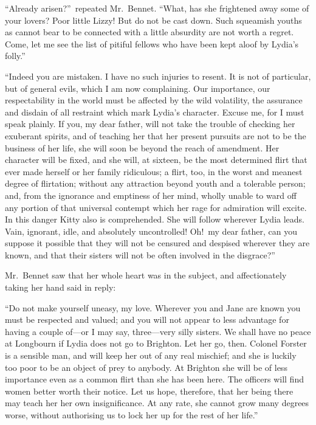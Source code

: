 \documentclass[12pt,english,oneside]{book}
\begin{document}
{}``Already arisen?''\ repeated Mr.\ Bennet. {}``What, has she
frightened away some of your lovers? Poor little Lizzy! But do not
be cast down. Such squeamish youths as cannot bear to be connected
with a little absurdity are not worth a regret. Come, let me see the
list of pitiful fellows who have been kept aloof by Lydia's folly.''

{}``Indeed you are mistaken. I have no such injuries to resent. It
is not of particular, but of general evils, which I am now complaining.
Our importance, our respectability in the world must be affected by
the wild volatility, the assurance and disdain of all restraint which
mark Lydia's character. Excuse me, for I must speak plainly. If you,
my dear father, will not take the trouble of checking her exuberant
spirits, and of teaching her that her present pursuits are not to
be the business of her life, she will soon be beyond the reach of
amendment. Her character will be fixed, and she will, at sixteen,
be the most determined flirt that ever made herself or her family
ridiculous; a flirt, too, in the worst and meanest degree of flirtation;
without any attraction beyond youth and a tolerable person; and, from
the ignorance and emptiness of her mind, wholly unable to ward off
any portion of that universal contempt which her rage for admiration
will excite. In this danger Kitty also is comprehended. She will follow
wherever Lydia leads. Vain, ignorant, idle, and absolutely uncontrolled!
Oh!\ my dear father, can you suppose it possible that they will not
be censured and despised wherever they are known, and that their sisters
will not be often involved in the disgrace?''\ 

Mr.\ Bennet saw that her whole heart was in the subject, and affectionately
taking her hand said in reply:

{}``Do not make yourself uneasy, my love. Wherever you and Jane are
known you must be respected and valued; and you will not appear to
less advantage for having a couple of\mbox{---}or I may say, three\mbox{---}very
silly sisters. We shall have no peace at Longbourn if Lydia does not
go to Brighton. Let her go, then. Colonel Forster is a sensible man,
and will keep her out of any real mischief; and she is luckily too
poor to be an object of prey to anybody. At Brighton she will be of
less importance even as a common flirt than she has been here. The
officers will find women better worth their notice. Let us hope, therefore,
that her being there may teach her her own insignificance. At any
rate, she cannot grow many degrees worse, without authorising us to
lock her up for the rest of her life.''
\end{document}
